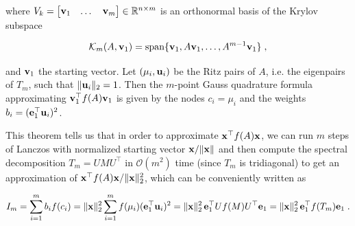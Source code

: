 \documentclass{article}
\begin{document}
{\begin{theorem}
where $V_k = \begin{bmatrix} \boldsymbol{\mathbf{v}}_1 & \dots & \boldsymbol{\mathbf{v}}_m \end{bmatrix} \in\mathbb R^{n\times m}$ is an orthonormal basis of the Krylov subspace

\begin{equation*}
    \mathcal K_m(A, \boldsymbol{\mathbf{v}}_1) = \text{span}\{\boldsymbol{\mathbf{v}}_1, A \boldsymbol{\mathbf{v}}_1, \ldots, A^{m-1} \boldsymbol{\mathbf{v}}_1\} \; ,
\end{equation*}

and $\boldsymbol{\mathbf{v}}_1$ the starting vector. Let $(\mu_i, \boldsymbol{\mathbf{u}}_i)$ be the Ritz pairs of $A$, i.e. the eigenpairs of $T_m$, such that $\Vert \boldsymbol{\mathbf{u}}_i \Vert_2 = 1$. Then the $m$-point Gauss quadrature formula approximating $\boldsymbol{\mathbf{v}}_1^\top f(A) \boldsymbol{\mathbf{v}}_1$ is given by the nodes $c_i = \mu_i$ and the weights $b_i = (\boldsymbol{\mathbf{e}}_1^\top \boldsymbol{\mathbf{u}}_i)^2$.
\end{theorem}

This theorem tells us that in order to approximate $\boldsymbol{\mathbf{x}}^\top f(A) \boldsymbol{\mathbf{x}}$, we can run $m$ steps of Lanczos with normalized starting vector $\boldsymbol{\mathbf{x}}  / \Vert \boldsymbol{\mathbf{x}} \Vert$ and then compute the spectral decomposition $T_m = U M U^\top$ in $\mathcal O(m^2)$ time (since $T_m$ is tridiagonal) to get an approximation of $\boldsymbol{\mathbf{x}}^\top f(A) \boldsymbol{\mathbf{x}} / \Vert \boldsymbol{\mathbf{x}} \Vert_2^2$, which can be conveniently written as

\begin{equation} \label{eq:lanczos_quadrature}
    I_m = \sum_{i=1}^m b_i f(c_i) = \Vert \boldsymbol{\mathbf{x}} \Vert_2^2 \sum_{i=1}^m f(\mu_i) (\boldsymbol{\mathbf{e}}_1^\top \boldsymbol{\mathbf{u}}_i)^2 
    = \Vert \boldsymbol{\mathbf{x}} \Vert_2^2 \, \boldsymbol{\mathbf{e}}_1^\top U f(M) U^\top \boldsymbol{\mathbf{e}}_1 = \Vert \boldsymbol{\mathbf{x}} \Vert_2^2 \,  \boldsymbol{\mathbf{e}}_1^\top f(T_m) \boldsymbol{\mathbf{e}}_1 \;.
\end{equation}


}
\end{document}
